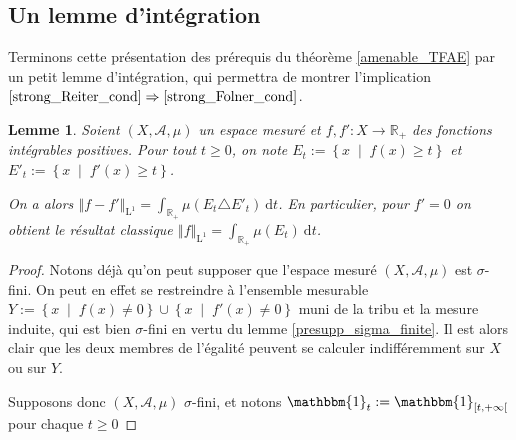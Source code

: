 \documentclass[a4paper,12pt]{article}
\newtheorem{lemma}[theorem]{Lemme}
\newcommand{\R}{\mathbb{R}}
\newcommand{\ev}{\mathrm{ev}}
\newcommand{\norm}[1]{\left\Vert #1\right\Vert}
\newcommand{\abs}[1]{\left\vert#1\right\vert}
\newcommand{\set}[1]{\left\{ #1 \right\}}
\newcommand{\indic}{\mathbbm{1}}
\newcommand{\integral}[4]{\int_{#1}^{#2} #3~\mathrm{d}#4}
\newcommand\fundef[3]{#1: \left\{\begin{array}{ccc}#2\\#3\end{array}\right.}
\newcommand{\tq}{\;\middle|\;}
\newcommand{\ssi}{si et seulement si }
\newcommand{\inv}{^{-1}}
\newcommand{\comp}{\circ}
\newcommand{\nhds}{\mathcal{N}}
\renewcommand{\implies}{\Rightarrow}
\renewcommand{\iff}{\Leftrightarrow}
\begin{document}

\subsection{Un lemme d'intégration}

Terminons cette présentation des prérequis du théorème \ref{amenable_TFAE} par un petit lemme d'intégration,
qui permettra de montrer l'implication $\eqref{strong_Reiter_cond}\implies\eqref{strong_Folner_cond}$. 

\begin{lemma}\label{folner_key}
    Soient $(X, \mathcal{A}, \mu)$ un espace mesuré et $f, f':X\to\R_+$ des fonctions intégrables positives.
    Pour tout $t\geq0$, on note $E_t := \set{x\tq f(x)\geq t}$ et $E'_t := \set{x\tq f'(x)\geq t}$.

    On a alors $\norm{f - f'}_{\mathrm{L}^1} = \integral{\R_+}{}{\mu(E_t\triangle E'_t)}{t}$. En particulier, pour $f' = 0$
    on obtient le résultat classique $\norm{f}_{\mathrm{L}^1} = \integral{\R_+}{}{\mu(E_t)}{t}$.
\end{lemma}

\begin{proof}
    Notons déjà qu'on peut supposer que l'espace mesuré $(X, \mathcal{A}, \mu)$ est $\sigma$-fini. On peut en effet 
    se restreindre à l'ensemble mesurable $Y := \set{x\tq f(x)\ne0} \cup \set{x\tq f'(x)\ne0}$ muni de la tribu et la mesure induite, 
    qui est bien $\sigma$-fini en vertu du lemme \ref{presupp_sigma_finite}. Il est alors clair que les deux membres 
    de l'égalité peuvent se calculer indifféremment sur $X$ ou sur $Y$.

    Supposons donc $(X, \mathcal{A}, \mu)$ $\sigma$-fini, et notons $\indic_t := \indic_{[t, +\infty[}$ pour chaque $t\geq0$
\end{proof}
\end{document}
